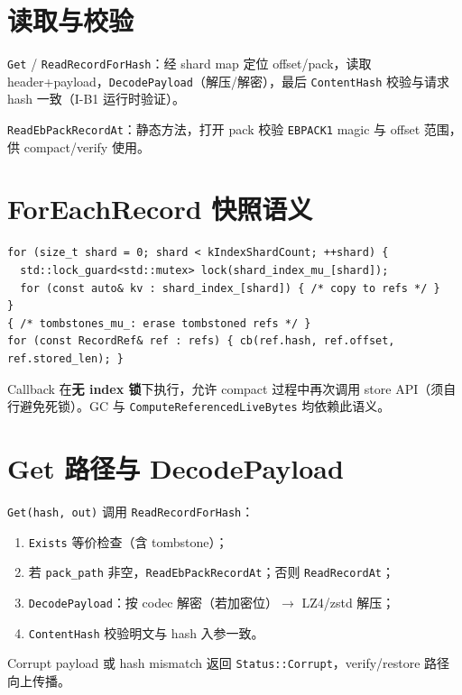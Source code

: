 \section{读取与校验}

\texttt{Get} / \texttt{ReadRecordForHash}：经 shard map 定位 offset/pack，读取 header+payload，\texttt{DecodePayload}（解压/解密），最后 \texttt{ContentHash} 校验与请求 hash 一致（I-B1 运行时验证）。

\texttt{ReadEbPackRecordAt}：静态方法，打开 pack 校验 \texttt{EBPACK1} magic 与 offset 范围，供 compact/verify 使用。

\section{ForEachRecord 快照语义}

\begin{lstlisting}[caption={ForEachRecord snapshot 模式（节选）},label={lst:foreach-record}]
for (size_t shard = 0; shard < kIndexShardCount; ++shard) {
  std::lock_guard<std::mutex> lock(shard_index_mu_[shard]);
  for (const auto& kv : shard_index_[shard]) { /* copy to refs */ }
}
{ /* tombstones_mu_: erase tombstoned refs */ }
for (const RecordRef& ref : refs) { cb(ref.hash, ref.offset, ref.stored_len); }
\end{lstlisting}

Callback 在\textbf{无 index 锁}下执行，允许 compact 过程中再次调用 store API（须自行避免死锁）。GC 与 \texttt{ComputeReferencedLiveBytes} 均依赖此语义。

\section{Get 路径与 DecodePayload}

\texttt{Get(hash, out)} 调用 \texttt{ReadRecordForHash}：
\begin{enumerate}[nosep]
  \item \texttt{Exists} 等价检查（含 tombstone）；
  \item 若 \texttt{pack\_path} 非空，\texttt{ReadEbPackRecordAt}；否则 \texttt{ReadRecordAt}；
  \item \texttt{DecodePayload}：按 codec 解密（若加密位）$\rightarrow$ LZ4/zstd 解压；
  \item \texttt{ContentHash} 校验明文与 hash 入参一致。
\end{enumerate}

Corrupt payload 或 hash mismatch 返回 \texttt{Status::Corrupt}，verify/restore 路径向上传播。

